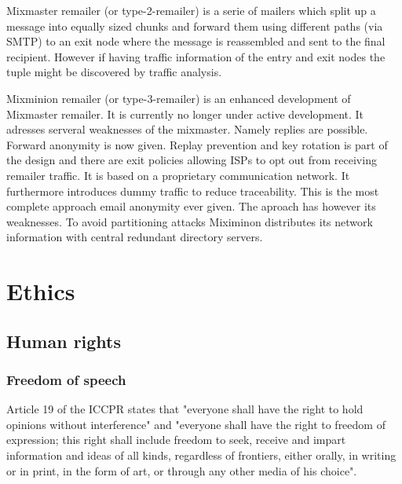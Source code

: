 Mixmaster remailer (or type-2-remailer) is a serie of mailers which split up a message into equally sized chunks and forward them using different paths (via SMTP) to an exit node where the message is reassembled and sent to the final recipient. However if having traffic information of the entry and exit nodes the tuple might be discovered by traffic analysis.\par

Mixminion remailer (or type-3-remailer) is an enhanced development of Mixmaster remailer. It is currently no longer under active development. It adresses serveral weaknesses of the mixmaster. Namely replies are possible. Forward anonymity is now given. Replay prevention and key rotation is part of the design and there are exit policies allowing ISPs to opt out from receiving remailer traffic. It is based on a proprietary communication network. It furthermore introduces dummy traffic to reduce traceability. This is the most complete approach email anonymity ever given. The aproach has however its weaknesses. To avoid partitioning attacks Miximinon distributes its network information with central redundant directory servers.\par

\section{Ethics}
\subsection{Human rights}
\subsubsection{Freedom of speech}
Article 19 of the ICCPR states that "everyone shall have the right to hold opinions without interference" and "everyone shall have the right to freedom of expression; this right shall include freedom to seek, receive and impart information and ideas of all kinds, regardless of frontiers, either orally, in writing or in print, in the form of art, or through any other media of his choice".

